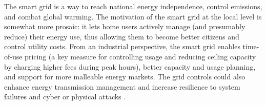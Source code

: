 The smart grid is a way to reach national energy independence, control emissions, and combat global warming. The motivation of the smart grid at the local level is somewhat more prosaic: it lets home users actively manage (and presumably reduce) their energy use, thus allowing them to become better citizens and control utility costs. From an industrial perspective, the smart grid enables time-of-use pricing (a key measure for controlling usage and reducing ceiling capacity by charging higher fees during peak hours), better capacity and usage planning, and support for more malleable energy markets. The grid controls could also enhance energy transmission management and increase resilience to system failures and cyber or physical attacks \cite{mcdaniel2009security}.



